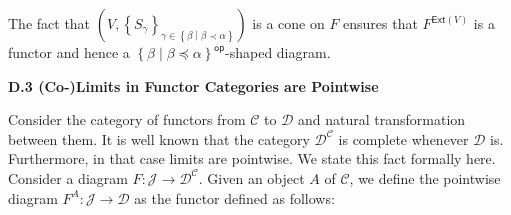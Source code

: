 \begin{center}\end{center}
 
The fact that $(V,\left\{S_{\gamma}\right\}_{\gamma\in\left\{\beta\middle|\beta\prec\alpha\right\}})$ is a cone on $F$ ensures that $F^{\mathsf{Ext}(V)}$ is a functor and hence a ${\left\{\beta\middle|\beta\preceq\alpha\right\}}^{\mathsf{op}}$-shaped diagram.\par
 
 
 
 
\par\medskip\noindent\textbf{D.3 (Co-)Limits in Functor Categories are Pointwise}\par
 
 
Consider the category of functors from $\mathcal{C}$ to $\mathcal{D}$ and natural transformation between them. It is well known that the category $\mathcal{D}^{\mathcal{C}}$ is complete whenever $\mathcal{D}$ is. Furthermore, in that case limits are pointwise. We state this fact formally here. Consider a diagram $F:\mathcal{J}\to\mathcal{D}^{\mathcal{C}}$. Given an object $A$ of $\mathcal{C}$, we define the pointwise diagram $F^{A}:\mathcal{J}\to\mathcal{D}$ as the functor defined as follows:\par
 
\begin{center}\end{center}
 
